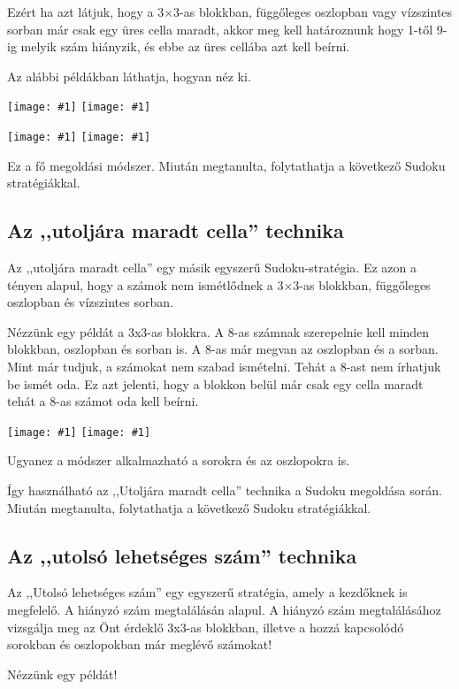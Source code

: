 \documentclass[a4paper,12pt,twoside]{article}
\newcommand{\kep}[1]{\texttt{[image: \#1]}}
\begin{document}
Ezért ha azt látjuk, hogy a 3×3-as blokkban, függőleges oszlopban vagy vízszintes sorban már csak egy üres cella maradt, akkor meg kell határoznunk hogy 1-től 9-ig melyik szám hiányzik, és ebbe az üres cellába azt kell beírni. 

Az alábbi példákban láthatja, hogyan néz ki. 

\kep{1646980448-1. Last Free Cell_1.png}
\kep{1646980448-1. Last Free Cell_2.png}

\kep{1646980448-1. Last Free Cell_3.png}
\kep{1646980448-1. Last Free Cell_4.png}

Ez a fő megoldási módszer. Miután megtanulta, folytathatja a következő Sudoku stratégiákkal. 

\subsection{Az ,,utoljára maradt cella'' technika}

Az ,,utoljára maradt cella'' egy másik egyszerű Sudoku-stratégia. Ez azon a tényen alapul, hogy a számok nem ismétlődnek a 3×3-as blokkban, függőleges oszlopban és vízszintes sorban.

Nézzünk egy példát a 3x3-as blokkra. A 8-as számnak szerepelnie kell minden blokkban, oszlopban és sorban is. A 8-as már megvan az oszlopban és a sorban. Mint már tudjuk, a számokat nem szabad ismételni. Tehát a 8-ast nem írhatjuk be ismét oda. Ez azt jelenti, hogy a blokkon belül már csak egy cella maradt tehát a 8-as számot oda kell beírni.

\kep{1646980980-2. Last remaining cell_1.png}
\kep{1646980980-2. Last remaining cell_2.png}

Ugyanez a módszer alkalmazható a sorokra és az oszlopokra is.

Így használható az ,,Utoljára maradt cella'' technika a Sudoku megoldása során. Miután megtanulta, folytathatja a következő Sudoku stratégiákkal.

\clearpage
\subsection{Az ,,utolsó lehetséges szám'' technika}

Az ,,Utolsó lehetséges szám'' egy egyszerű stratégia, amely a kezdőknek is megfelelő. A hiányzó szám megtalálásán alapul. A hiányzó szám megtalálásához vizsgálja meg az Önt érdeklő 3x3-as blokkban, illetve a hozzá kapcsolódó sorokban és oszlopokban már meglévő számokat!

Nézzünk egy példát!
\end{document}
